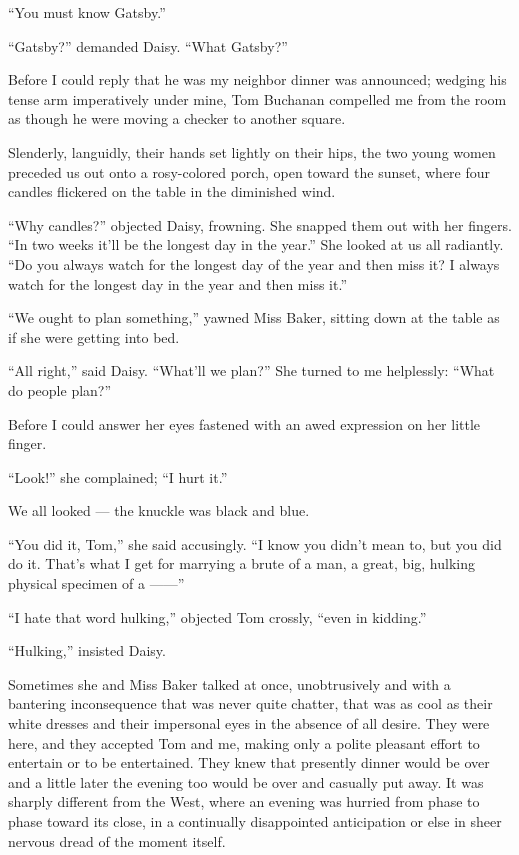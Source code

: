 \documentclass{znotebook}
\begin{document}
``You must know Gatsby.''

``Gatsby?'' demanded Daisy. ``What Gatsby?''

Before I could reply that he was my neighbor dinner was announced; wedging his tense arm imperatively under mine, Tom Buchanan compelled me from the room as though he were moving a checker to another square.

Slenderly, languidly, their hands set lightly on their hips, the two young women preceded us out onto a rosy-colored porch, open toward the sunset, where four candles flickered on the table in the diminished wind.

``Why candles?'' objected Daisy, frowning. She snapped them out with her fingers. ``In two weeks it’ll be the longest day in the year.'' She looked at us all radiantly. ``Do you always watch for the longest day of the year and then miss it? I always watch for the longest day in the year and then miss it.''

``We ought to plan something,'' yawned Miss Baker, sitting down at the table as if she were getting into bed.

``All right,'' said Daisy. ``What’ll we plan?'' She turned to me helplessly: ``What do people plan?''

Before I could answer her eyes fastened with an awed expression on her little finger.

``Look!'' she complained; ``I hurt it.''

We all looked — the knuckle was black and blue.

``You did it, Tom,'' she said accusingly. ``I know you didn’t mean to, but you did do it. That’s what I get for marrying a brute of a man, a great, big, hulking physical specimen of a ——''

``I hate that word hulking,'' objected Tom crossly, ``even in kidding.''

``Hulking,'' insisted Daisy.

Sometimes she and Miss Baker talked at once, unobtrusively and with a bantering inconsequence that was never quite chatter, that was as cool as their white dresses and their impersonal eyes in the absence of all desire. They were here, and they accepted Tom and me, making only a polite pleasant effort to entertain or to be entertained. They knew that presently dinner would be over and a little later the evening too would be over and casually put away. It was sharply different from the West, where an evening was hurried from phase to phase toward its close, in a continually disappointed anticipation or else in sheer nervous dread of the moment itself.
\end{document}
